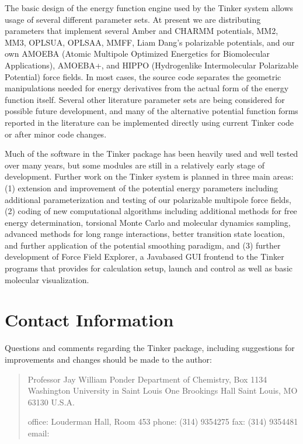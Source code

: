 \documentclass[letterpaper,11pt,english]{sphinxmanual}
\begin{document}
\sphinxAtStartPar
The basic design of the energy function engine used by the Tinker system allows usage of several different parameter sets. At present we are distributing parameters that implement several Amber and CHARMM potentials, MM2, MM3, OPLS\sphinxhyphen{}UA, OPLS\sphinxhyphen{}AA, MMFF, Liam Dang’s polarizable potentials, and our own AMOEBA (Atomic Multipole Optimized Energetics for Biomolecular Applications), AMOEBA+, and HIPPO (Hydrogen\sphinxhyphen{}like Intermolecular Polarizable Potential) force fields. In most cases, the source code separates the geometric manipulations needed for energy derivatives from the actual form of the energy function itself. Several other literature parameter sets are being considered for possible future development, and many of the alternative potential function forms reported in the literature can be implemented directly using current Tinker code or after minor code changes.

\sphinxAtStartPar
Much of the software in the Tinker package has been heavily used and well tested over many years, but some modules are still in a relatively early stage of development. Further work on the Tinker system is planned in three main areas: (1) extension and improvement of the potential energy parameters including additional parameterization and testing of our polarizable multipole force fields, (2) coding of new computational algorithms including additional methods for free energy determination, torsional Monte Carlo and molecular dynamics sampling, advanced methods for long range interactions, better transition state location, and further application of the potential smoothing paradigm, and (3) further development of Force Field Explorer, a Java\sphinxhyphen{}based GUI front\sphinxhyphen{}end to the Tinker programs that provides for calculation setup, launch and control as well as basic molecular visualization.


\section{Contact Information}
\label{\detokenize{text/introduction:contact-information}}
\sphinxAtStartPar
Questions and comments regarding the Tinker package, including suggestions for improvements and changes should be made to the author:
\begin{quote}

\sphinxAtStartPar
Professor Jay William Ponder
Department of Chemistry, Box 1134
Washington University in Saint Louis
One Brookings Hall
Saint Louis, MO 63130 U.S.A.

\sphinxAtStartPar
office: Louderman Hall, Room 453
phone:  (314) 935\sphinxhyphen{}4275
fax:    (314) 935\sphinxhyphen{}4481
email:  
\end{quote}
\end{document}
